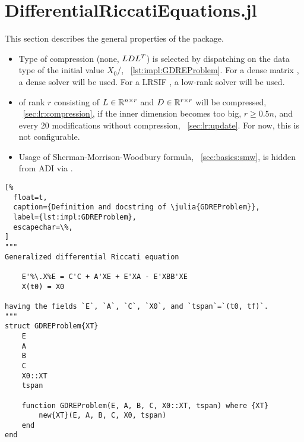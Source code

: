 \section{DifferentialRiccatiEquations.jl}
\label{sec:impl:DRE}

This section describes the general properties of the  package.

\begin{itemize}
  \item
    Type of compression (none, $LDL^T$) is selected by dispatching on the data type of the initial value $X_0$/,
    \cf~\autoref{lst:impl:GDREProblem}.
    For a dense matrix , a dense solver will be used.
    For a \ac{LRSIF} , a low-rank solver will be used.
  \item
     of rank $r$ consisting of $L \in\mathbb{R}^{n\times r}$ and $D\in\mathbb{R}^{r\times r}$ will be compressed,
    \cf~\autoref{sec:lr:compression},
    if the inner dimension becomes too big, $r \geq 0.5 n$,
    and every 20 modifications without compression,
    \cf~\autoref{sec:lr:update}.
    For now, this is not configurable.
  \item
    Usage of Sherman-Morrison-Woodbury formula, \cf~\autoref{sec:basics:smw},
    is hidden from \ac{ADI} via .
\end{itemize}

\begin{lstlisting}[%
  float=t,
  caption={Definition and docstring of \julia{GDREProblem}},
  label={lst:impl:GDREProblem},
  escapechar=\%,
]
"""
Generalized differential Riccati equation

    E'%\.X%E = C'C + A'XE + E'XA - E'XBB'XE
    X(t0) = X0

having the fields `E`, `A`, `C`, `X0`, and `tspan`=`(t0, tf)`.
"""
struct GDREProblem{XT}
    E
    A
    B
    C
    X0::XT
    tspan

    function GDREProblem(E, A, B, C, X0::XT, tspan) where {XT}
        new{XT}(E, A, B, C, X0, tspan)
    end
end
\end{lstlisting}
